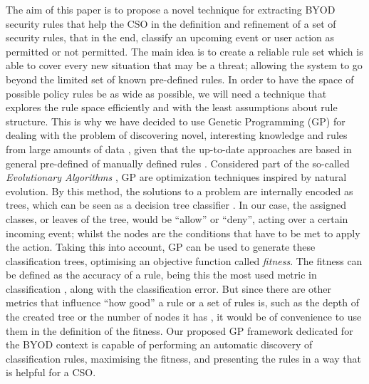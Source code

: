 \documentclass[a4paper,10pt,twocolumn,preprint,3p]{elsarticle}
\begin{document}
The aim of this paper is to propose a novel technique for extracting
BYOD security rules that help the CSO in the definition and refinement
of a set of security rules, that in the end, classify an upcoming
event or user action as permitted or not permitted.
The main idea is to create a reliable rule set
which is able to cover every new situation that may be a threat;
allowing the system to go beyond the limited set of known pre-defined
rules. In order to have the space of possible policy rules be as wide
as possible, we will need a technique that explores the rule space
efficiently and with the least assumptions about rule structure.
This is why we have decided to use Genetic Programming (GP) for dealing with the problem of
discovering novel, interesting knowledge and rules from large
amounts of data \cite{freitas2002data}, given that the up-to-date approaches are based in general pre-defined of manually defined rules \cite{ali2015analysis}. Considered part of the so-called \emph{Evolutionary
  Algorithms} \cite{back1996evolutionary}, GP are optimization
techniques inspired by natural evolution. By this method, the
solutions to a problem are internally encoded as trees, which can be
seen as a decision tree classifier \cite{safavian1990survey}. In our case, the assigned classes, or leaves of the tree, would be ``allow'' or ``deny'', acting over a certain incoming event; whilst the nodes are the conditions that have to be met to apply the action. Taking this into account, GP can be used to generate these classification trees, optimising an objective function called {\em fitness}. The fitness can be defined as the accuracy of a rule, being this the most used metric in classification \cite{witten2005data}, along with the classification error. But since there are other metrics that influence ``how good'' a rule or a set of rules is, such as the depth of the created tree or the number of nodes it has \cite{back1996evolutionary}, it would be of convenience to use them in the definition of the fitness.
Our proposed GP framework dedicated
for the BYOD context is capable of performing an automatic discovery
of classification rules, maximising the fitness, and presenting the rules in a way that is helpful for a CSO.
\end{document}
